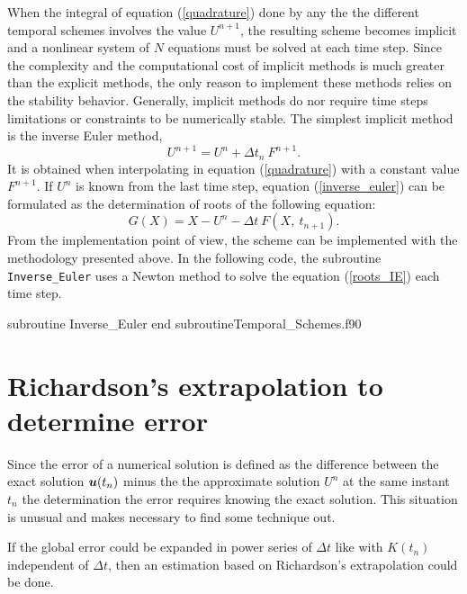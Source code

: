  When the integral of equation (\ref{quadrature}) done by any the the different temporal schemes involves the value $ U^{n+1} $, the resulting scheme becomes implicit and a nonlinear system of $ N $ equations must be solved at each time step. Since the complexity and the computational cost of implicit methods is much greater than the explicit methods, the only reason to implement these methods relies on the stability behavior.  Generally, implicit methods do nor require time steps limitations or constraints to be numerically stable. The simplest implicit method is the inverse Euler method, 
 \begin{equation}
 U^{n+1} = U^n + \Delta t_n \ F^{n+1}.
 \label{inverse_euler}
 \end{equation}
 It is obtained when interpolating in equation (\ref{quadrature}) with a constant value $ F^{n+1} $.  
 If $ U^n $ is known from the last time step, equation (\ref{inverse_euler}) can be formulated  as the determination of roots of the following equation: 
 \begin{equation}
     G(X) = X - U^n - \Delta t \ F( X, \ t_{n+1} ).
     \label{roots_IE}
 \end{equation} 
 From the implementation point of view, the scheme can be implemented with the methodology presented above. 
 In the following code, the subroutine \verb|Inverse_Euler| uses a Newton method to solve the  equation (\ref{roots_IE}) each time step. 
 
   \vspace{0.5cm} 
        {subroutine Inverse_Euler}
        {end subroutine}{Temporal_Schemes.f90}
 
 
  \newpage
 \section{Richardson's extrapolation to determine error}
 
 Since the error of a numerical solution is defined as the difference between the exact solution $\boldsymbol{u}(t_n) $ minus the the approximate solution $ U^n $ at the same instant $ t_n $ 
the  determination the error  requires knowing the exact solution. 
This situation is unusual and  makes necessary to find some technique out. 
 
If the global error could be expanded in power series of $ \Delta t $ like 
with $ K(t_n)$ independent of $ \Delta t $, then  an estimation based on Richardson's extrapolation could be done. 


